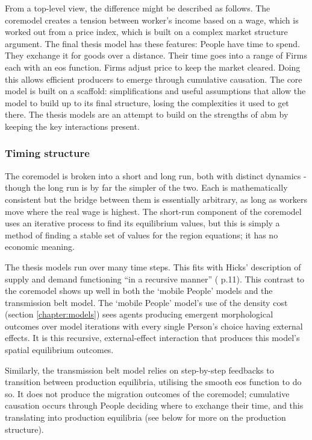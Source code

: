From a top-level view, the difference might be described as follows. The \gls{coremodel} creates a tension between worker's income based on a wage, which is worked out from a price index, which is built on a complex market structure argument. The final thesis model has these features: People have time to spend. They exchange it for goods over a distance. Their time goes into a range of Firms each with an \gls{eos} function. Firms adjust price to keep the market cleared. Doing this allows efficient producers to emerge through cumulative causation. The core model is built on a scaffold: simplifications and useful assumptions that allow the model to build up to its final structure, losing the complexities it used to get there. The thesis models are an attempt to build on the strengths of \gls{abm} by keeping the key interactions present.

\subsubsection{Timing structure}

The \gls{coremodel} is broken into a short and long run, both with distinct dynamics - though the long run is by far the simpler of the two. Each is mathematically consistent but the bridge between them is essentially arbitrary, as long as workers move where the real wage is highest. The short-run component of the \gls{coremodel} uses an iterative process to find its equilibrium values, but this is simply a method of finding a stable set of values for the region equations; it has no economic meaning.

The thesis models run over many time steps. This fits with Hicks' description of supply and demand functioning ``in a recursive manner'' (\citealt{hicks_market_1989} p.11). This contrast to the \gls{coremodel} shows up well in both the `mobile People' models and the transmission belt model. The `mobile People' model's use of the density cost (section \ref{chapter:models}) sees agents producing emergent morphological outcomes over model iterations with every single Person's choice having external effects. It is this recursive, external-effect interaction that produces this model's spatial equilibrium outcomes.

Similarly, the transmission belt model relies on step-by-step feedbacks to transition between production equilibria, utilising the smooth \gls{eos} function to do so. It does not produce the migration outcomes of the \gls{coremodel}; cumulative causation occurs through People deciding where to exchange their time, and this translating into production equilibria (see below for more on the production structure).

